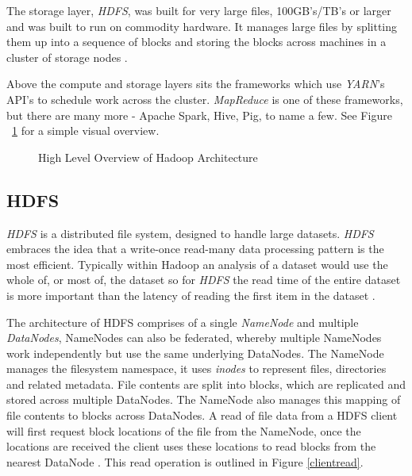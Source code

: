 \documentclass[conference]{IEEEtran}
\begin{document}
The storage layer, \emph{HDFS}, was built for very large files, 100GB's/TB's or larger and was built to run on commodity hardware. It manages large files by splitting them up into a sequence of blocks and storing the blocks across machines in a cluster of storage nodes \cite{hdfs}.

Above the compute and storage layers sits the frameworks which use \emph{YARN}'s API's to schedule work across the cluster. \emph{MapReduce} is one of these frameworks, but there are many more - Apache Spark, Hive, Pig, to name a few. See Figure ~\ref{highlevelarch} for a simple visual overview.

\begin{figure}[ht]
\centering
{}
\caption{High Level Overview of Hadoop Architecture}
\label{highlevelarch}
\end{figure}

\subsection{HDFS}
\emph{HDFS} is a distributed file system, designed to handle large datasets. \emph{HDFS} embraces the idea that a write-once read-many data processing pattern is the most efficient. Typically within Hadoop an analysis of a dataset would use the whole of, or most of, the dataset so for \emph{HDFS} the read time of the entire dataset is more important than the latency of reading the first item in the dataset \cite{hdfs}. 

The architecture of HDFS comprises of a single \emph{NameNode} and multiple \emph{DataNodes}, NameNodes can also be federated, whereby multiple NameNodes work independently but use the same underlying DataNodes. The NameNode manages the filesystem namespace, it uses \emph{inodes} to represent files, directories and related metadata. File contents are split into blocks, which are replicated and stored across multiple DataNodes. The NameNode also manages this mapping of file contents to blocks across DataNodes. A read of file data from a HDFS client will first request block locations of the file from the NameNode, once the locations are received the client uses these locations to read blocks from the nearest DataNode \cite{hdfs}. This read operation is outlined in Figure \ref{clientread}.
\end{document}
